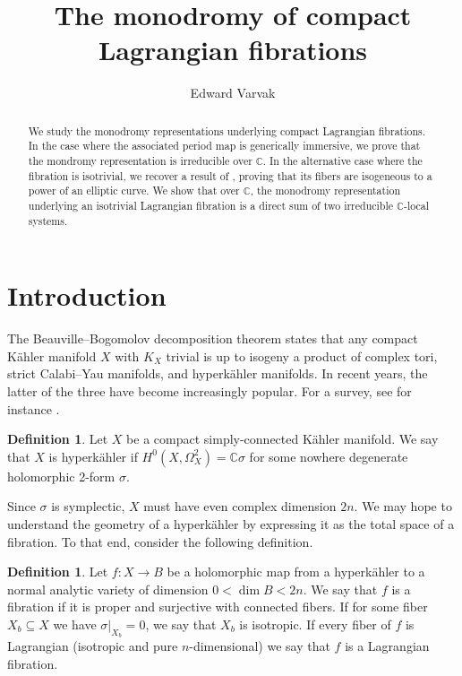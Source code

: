\documentclass[12pt]{amsart}
\title{The monodromy of compact Lagrangian fibrations}
\author{Edward Varvak}
\newcommand{\C}{\mathbb{C}}
\theoremstyle{definition}
\newtheorem{definition}[theorem]{Definition}
\theoremstyle{remark}
\numberwithin{equation}{section}
\begin{document}
\begin{abstract}
    We study the monodromy representations underlying compact Lagrangian fibrations. 
    In the case where the associated period map is generically immersive, we prove 
    that the mondromy representation is irreducible over \(\mathbb{C}\). In the
    alternative case where the fibration is isotrivial, we recover a result of
    \cite{kim-laza-martin23}, proving that its fibers are isogeneous to a power of
    an elliptic curve. We show that over \(\mathbb{C}\), the monodromy representation
    underlying an isotrivial Lagrangian fibration is a direct sum of two irreducible
    \(\mathbb{C}\)-local systems.
\end{abstract}


\maketitle


\section{Introduction}

The Beauville--Bogomolov decomposition theorem states that any compact K\"ahler
manifold \(X\) with \(K_X\) trivial is up to isogeny a product of complex tori,
strict Calabi--Yau manifolds, and hyperk\"ahler manifolds. In recent years, the 
latter of the three have become increasingly popular. For a survey, see for instance
\cite{deb22}.

\begin{definition}
    Let \(X\) be a compact simply-connected K\"ahler manifold. We say that \(X\) is
    hyperk\"ahler if \(H^0(X, \Omega_X^2) = \C \sigma\) for some nowhere
    degenerate holomorphic 2-form \(\sigma\).
\end{definition}

Since \(\sigma\) is symplectic, \(X\) must have even complex dimension \(2n\).
We may hope to understand the geometry of a hyperk\"ahler by expressing it as the
total space of a fibration. To that end, consider the following definition.

\begin{definition}
    Let \(f: X \to B\) be a holomorphic map from a hyperk\"ahler to a normal analytic
    variety of dimension \(0 < \dim B < 2n\).
    We say that \(f\) is a fibration if it is proper and surjective with connected 
    fibers. If for some fiber \(X_b \subseteq X\) we have \(\sigma|_{X_b} = 0\),
    we say that \(X_b\) is isotropic. If every fiber of \(f\) is Lagrangian 
    (isotropic and pure \(n\)-dimensional) we say that \(f\) is a Lagrangian fibration.
\end{definition}
\end{document}
